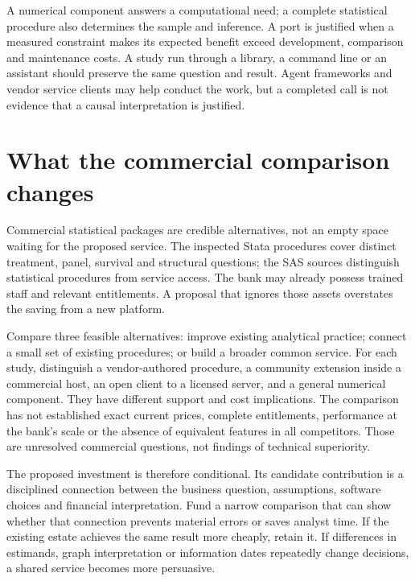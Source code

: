 A numerical component answers a computational need; a complete statistical
procedure also determines the sample and inference. A port is justified when
a measured constraint makes its expected benefit exceed development, comparison
and maintenance costs. A study run
through a library, a command line or an assistant should preserve the same
question and result. Agent frameworks and vendor service clients may help
conduct the work, but a completed call is not evidence that a causal
interpretation is justified.
\citep{exec24_framework_contracts,exec23_workflow_sasctl}



\section{What the commercial comparison changes}
Commercial statistical packages are credible alternatives, not an empty space
waiting for the proposed service. The inspected Stata procedures cover distinct
treatment, panel, survival and structural questions; the SAS sources distinguish
statistical procedures from service access. The bank may already possess
trained staff and relevant entitlements. A proposal that ignores those assets
overstates the saving from a new platform.
\citep{exec13_ci_stata_causal_intro,exec18_gp_stata_xthdid,
exec14_survival_stata,exec13_ivrd_sas,exec23_workflow_sasctl}

Compare three feasible alternatives: improve existing analytical practice;
connect a small set of existing procedures; or build a broader common service.
For each study, distinguish a vendor-authored procedure, a community extension
inside a commercial host, an open client to a licensed server, and a general
numerical component. They have different support and cost implications. The
comparison has not established exact current prices, complete entitlements,
performance at the bank's scale or the absence of equivalent features in all
competitors. Those are unresolved commercial questions, not findings of
technical superiority.

The proposed investment is therefore conditional. Its candidate contribution
is a disciplined connection between the business question, assumptions,
software choices and financial interpretation. Fund a narrow comparison that
can show whether that connection prevents material errors or saves analyst
time. If the existing estate achieves the same result more cheaply, retain it.
If differences in estimands, graph interpretation or information dates repeatedly
change decisions, a shared service becomes more persuasive.

